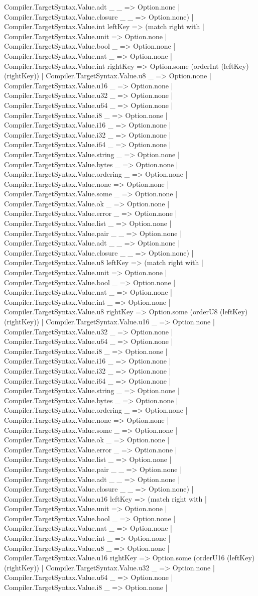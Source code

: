 \documentclass[11pt]{article}
\begin{document}
Compiler.TargetSyntax.Value.adt \_ \_ => Option.none | Compiler.TargetSyntax.Value.closure \_ \_ => Option.none) | Compiler.TargetSyntax.Value.int leftKey => (match right with | Compiler.TargetSyntax.Value.unit => Option.none | Compiler.TargetSyntax.Value.bool \_ => Option.none | Compiler.TargetSyntax.Value.nat \_ => Option.none | Compiler.TargetSyntax.Value.int rightKey => Option.some (orderInt (leftKey) (rightKey)) | Compiler.TargetSyntax.Value.u8 \_ => Option.none | Compiler.TargetSyntax.Value.u16 \_ => Option.none | Compiler.TargetSyntax.Value.u32 \_ => Option.none | Compiler.TargetSyntax.Value.u64 \_ => Option.none | Compiler.TargetSyntax.Value.i8 \_ => Option.none | Compiler.TargetSyntax.Value.i16 \_ => Option.none | Compiler.TargetSyntax.Value.i32 \_ => Option.none | Compiler.TargetSyntax.Value.i64 \_ => Option.none | Compiler.TargetSyntax.Value.string \_ => Option.none | Compiler.TargetSyntax.Value.bytes \_ => Option.none | Compiler.TargetSyntax.Value.ordering \_ => Option.none | Compiler.TargetSyntax.Value.none => Option.none | Compiler.TargetSyntax.Value.some \_ => Option.none | Compiler.TargetSyntax.Value.ok \_ => Option.none | Compiler.TargetSyntax.Value.error \_ => Option.none | Compiler.TargetSyntax.Value.list \_ => Option.none | Compiler.TargetSyntax.Value.pair \_ \_ => Option.none | Compiler.TargetSyntax.Value.adt \_ \_ => Option.none | Compiler.TargetSyntax.Value.closure \_ \_ => Option.none) | Compiler.TargetSyntax.Value.u8 leftKey => (match right with | Compiler.TargetSyntax.Value.unit => Option.none | Compiler.TargetSyntax.Value.bool \_ => Option.none | Compiler.TargetSyntax.Value.nat \_ => Option.none | Compiler.TargetSyntax.Value.int \_ => Option.none | Compiler.TargetSyntax.Value.u8 rightKey => Option.some (orderU8 (leftKey) (rightKey)) | Compiler.TargetSyntax.Value.u16 \_ => Option.none | Compiler.TargetSyntax.Value.u32 \_ => Option.none | Compiler.TargetSyntax.Value.u64 \_ => Option.none | Compiler.TargetSyntax.Value.i8 \_ => Option.none | Compiler.TargetSyntax.Value.i16 \_ => Option.none | Compiler.TargetSyntax.Value.i32 \_ => Option.none | Compiler.TargetSyntax.Value.i64 \_ => Option.none | Compiler.TargetSyntax.Value.string \_ => Option.none | Compiler.TargetSyntax.Value.bytes \_ => Option.none | Compiler.TargetSyntax.Value.ordering \_ => Option.none | Compiler.TargetSyntax.Value.none => Option.none | Compiler.TargetSyntax.Value.some \_ => Option.none | Compiler.TargetSyntax.Value.ok \_ => Option.none | Compiler.TargetSyntax.Value.error \_ => Option.none | Compiler.TargetSyntax.Value.list \_ => Option.none | Compiler.TargetSyntax.Value.pair \_ \_ => Option.none | Compiler.TargetSyntax.Value.adt \_ \_ => Option.none | Compiler.TargetSyntax.Value.closure \_ \_ => Option.none) | Compiler.TargetSyntax.Value.u16 leftKey => (match right with | Compiler.TargetSyntax.Value.unit => Option.none | Compiler.TargetSyntax.Value.bool \_ => Option.none | Compiler.TargetSyntax.Value.nat \_ => Option.none | Compiler.TargetSyntax.Value.int \_ => Option.none | Compiler.TargetSyntax.Value.u8 \_ => Option.none | Compiler.TargetSyntax.Value.u16 rightKey => Option.some (orderU16 (leftKey) (rightKey)) | Compiler.TargetSyntax.Value.u32 \_ => Option.none | Compiler.TargetSyntax.Value.u64 \_ => Option.none | Compiler.TargetSyntax.Value.i8 \_ => Option.none | 
\end{document}
